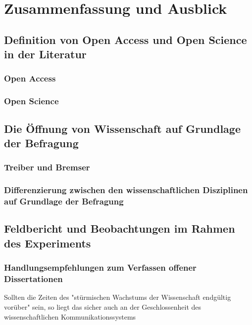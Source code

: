 \chapter{Zusammenfassung und Ausblick}

\section{Definition von Open Access und Open Science in der Literatur}
\subsection{Open Access}
\subsection{Open Science}
\section{Die Öffnung von Wissenschaft auf Grundlage der Befragung}
\subsection{Treiber und Bremser}
\subsection{Differenzierung zwischen den wissenschaftlichen Disziplinen auf Grundlage der Befragung}
\section{Feldbericht und Beobachtungen im Rahmen des Experiments}
\subsection{Handlungsempfehlungen zum Verfassen offener Dissertationen}


Sollten die Zeiten des "stürmischen Wachstums der Wissenschaft endgültig vorüber" \cite{K_lbel_2002} sein, so liegt das sicher auch an der Geschlossenheit des wissenschaftlichen Kommunikationssystems